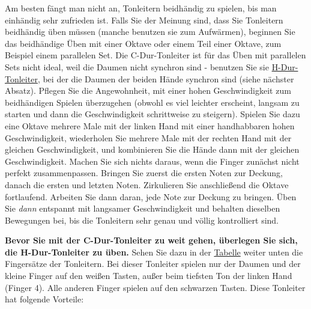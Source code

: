 Am besten fängt man nicht an, Tonleitern beidhändig zu spielen, bis man einhändig sehr zufrieden ist.
Falls Sie der Meinung sind, dass Sie Tonleitern beidhändig üben müssen (manche benutzen sie zum Aufwärmen), beginnen Sie das beidhändige Üben mit einer Oktave oder einem Teil einer Oktave, zum Beispiel einem parallelen Set.
Die C-Dur-Tonleiter ist für das Üben mit parallelen Sets nicht ideal, weil die Daumen nicht synchron sind - benutzen Sie sie \hyperlink{hdur}{H-Dur-Tonleiter}, bei der die Daumen der beiden Hände synchron sind (siehe nächster Absatz).
Pflegen Sie die Angewohnheit, mit einer hohen Geschwindigkeit zum beidhändigen Spielen überzugehen (obwohl es viel leichter erscheint, langsam zu starten und dann die Geschwindigkeit schrittweise zu steigern).
Spielen Sie dazu eine Oktave mehrere Male mit der linken Hand mit einer handhabbaren hohen Geschwindigkeit, wiederholen Sie mehrere Male mit der rechten Hand mit der gleichen Geschwindigkeit, und kombinieren Sie die Hände dann mit der gleichen Geschwindigkeit.
Machen Sie sich nichts daraus, wenn die Finger zunächst nicht perfekt zusammenpassen.
Bringen Sie zuerst die ersten Noten zur Deckung, danach die ersten und letzten Noten.
Zirkulieren Sie anschließend die Oktave fortlaufend.
Arbeiten Sie dann daran, jede Note zur Deckung zu bringen.
Üben Sie \textit{dann} entspannt mit langsamer Geschwindigkeit und behalten dieselben Bewegungen bei, bis die Tonleitern sehr genau und völlig kontrolliert sind.


\hypertarget{hdur}{}

\textbf{Bevor Sie mit der C-Dur-Tonleiter zu weit gehen, überlegen Sie sich, die H-Dur-Tonleiter zu üben.}
Sehen Sie dazu in der \hyperlink{table}{Tabelle} weiter unten die Fingersätze der Tonleitern.
Bei dieser Tonleiter spielen nur der Daumen und der kleine Finger auf den weißen Tasten, außer beim tiefsten Ton der linken Hand (Finger 4).
Alle anderen Finger spielen auf den schwarzen Tasten.
Diese Tonleiter hat folgende Vorteile:

